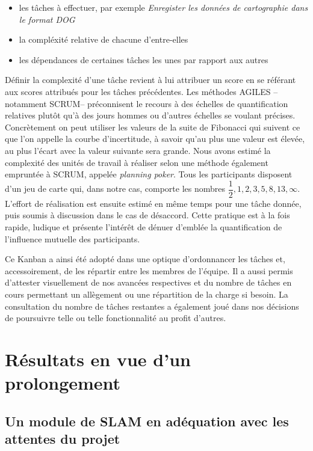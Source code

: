  \begin{itemize}
   \item les tâches à effectuer, par exemple \emph{Enregister les données de cartographie dans le format DOG}
   \item la compléxité relative de chacune d'entre-elles 
   \item les dépendances de certaines tâches les unes par rapport aux autres
  \end{itemize}

  Définir la \og complexité \fg{} d'une tâche revient à lui attribuer un score en se référant aux scores attribués pour les tâches précédentes. 
  Les méthodes AGILES --notamment \gls{SCRUM}-- préconnisent le recours à des échelles de quantification relatives plutôt qu'à des jours hommes ou d'autres échelles se voulant précises. 
  Concrètement on peut utiliser les valeurs de la suite de Fibonacci qui suivent ce que l'on appelle la courbe d'incertitude, à savoir qu'au plus une valeur est élevée, au plus l'écart avec la valeur suivante sera grande. 
  Nous avons estimé la complexité des unités de travail à réaliser selon une méthode également empruntée à SCRUM, appelée \emph{planning poker}. 
  Tous les participants disposent d'un jeu de carte qui, dans notre cas, comporte les nombres $\dfrac{1}2, 1, 2, 3, 5, 8, 13, \infty$. 
  L'effort de réalisation est ensuite estimé en même temps pour une tâche donnée, puis soumis à discussion dans le cas de désaccord. 
  Cette pratique est à la fois rapide, ludique et présente l'intérêt de dénuer d'emblée la quantification de l'influence mutuelle des participants. 
  
  Ce Kanban a ainsi été adopté dans une optique d'ordonnancer les tâches et, accessoirement, de les répartir entre les membres de l'équipe. 
  Il a aussi permis d'attester visuellement de nos avancées respectives et du nombre de tâches en cours permettant un allègement ou une répartition de la charge si besoin.
  La consultation du nombre de tâches restantes a également joué dans nos décisions de poursuivre telle ou telle fonctionnalité au profit d'autres. 
  
\section{Résultats en vue d'un prolongement}  
  \subsection{Un module de SLAM en adéquation avec les attentes du projet}
  
